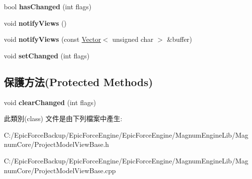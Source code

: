 \begin{DoxyCompactItemize}
\item 
bool {\bfseries has\+Changed} (int flags)\hypertarget{class_magnum_1_1_project_model_base_aa4fdc80657bbe4d08c2c23b88c63f08b}{}\label{class_magnum_1_1_project_model_base_aa4fdc80657bbe4d08c2c23b88c63f08b}

\item 
void {\bfseries notify\+Views} ()\hypertarget{class_magnum_1_1_project_model_base_ad3b29e9234ca1edc42800d7ef39f3d98}{}\label{class_magnum_1_1_project_model_base_ad3b29e9234ca1edc42800d7ef39f3d98}

\item 
void {\bfseries notify\+Views} (const \hyperlink{class_magnum_1_1_vector}{Vector}$<$ unsigned char $>$ \&buffer)\hypertarget{class_magnum_1_1_project_model_base_a9826681909bde255cb574835109daaef}{}\label{class_magnum_1_1_project_model_base_a9826681909bde255cb574835109daaef}

\item 
void {\bfseries set\+Changed} (int flags)\hypertarget{class_magnum_1_1_project_model_base_ad877bb466e847bd27837b16c53a789a5}{}\label{class_magnum_1_1_project_model_base_ad877bb466e847bd27837b16c53a789a5}

\end{DoxyCompactItemize}
\subsection*{保護方法(Protected Methods)}
\begin{DoxyCompactItemize}
\item 
void {\bfseries clear\+Changed} (int flags)\hypertarget{class_magnum_1_1_project_model_base_af1d4f342ffb3ce23af48b4446c1569a9}{}\label{class_magnum_1_1_project_model_base_af1d4f342ffb3ce23af48b4446c1569a9}

\end{DoxyCompactItemize}


此類別(class) 文件是由下列檔案中產生\+:\begin{DoxyCompactItemize}
\item 
C\+:/\+Epic\+Force\+Backup/\+Epic\+Force\+Engine/\+Epic\+Force\+Engine/\+Magnum\+Engine\+Lib/\+Magnum\+Core/Project\+Model\+View\+Base.\+h\item 
C\+:/\+Epic\+Force\+Backup/\+Epic\+Force\+Engine/\+Epic\+Force\+Engine/\+Magnum\+Engine\+Lib/\+Magnum\+Core/Project\+Model\+View\+Base.\+cpp\end{DoxyCompactItemize}
